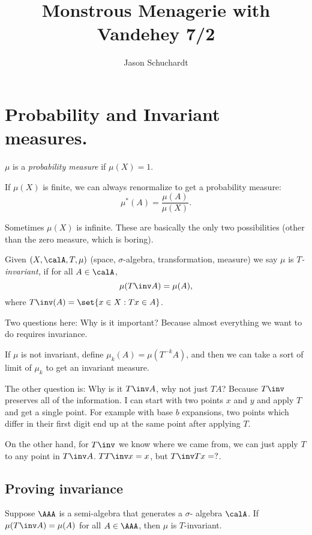 \documentclass{article}
\title{Monstrous Menagerie with Vandehey 7/2}
\author{Jason Schuchardt}
\theoremstyle{remark}
\begin{document}
\maketitle

\section{Probability and Invariant measures.}

\begin{definition}
    $\mu$ is a \emph{probability measure} if $\mu(X)=1$.
\end{definition}

If $\mu(X)$ is finite, we can always renormalize to get a
probability measure:
\[ \mu^*(A) = \frac{\mu(A)}{\mu(X)}. \]

Sometimes $\mu(X)$ is infinite. These are basically the only two
possibilities (other than the zero measure, which is boring).

\begin{definition}
Given $(X,\calA,T,\mu)$ 
(space, $\sigma$-algebra, transformation, measure)
we say $\mu$ is \emph{$T$-invariant,} if 
for all $A\in \calA$, 
\[\mu(T\inv A)=\mu(A),\]
where $T\inv(A) = \set{x\in X : Tx\in A}$.
\end{definition}

Two questions here: Why is it important? Because almost 
everything we want to do requires invariance.

If $\mu$ is not invariant,
define $\mu_k(A) = \mu(T^{-k}A)$,
and then we can take a sort of limit of $\mu_k$ to get an
invariant measure.

The other question is: Why is it $T\inv A$, why not just
$TA$? Because $T\inv$ preserves all of the information.
I can start with two points $x$ and $y$ and apply $T$ and
get a single point. For example with base $b$ expansions,
two points which differ in their first digit end up at the 
same point after applying $T$.

On the other hand, for $T\inv$ we know where we came from,
we can just apply $T$ to any point in $T\inv A$.
$TT\inv x = x$, but $T\inv T x = ?$.

\subsection{Proving invariance}

\begin{theorem}
    Suppose $\AAA$ is a semi-algebra that generates a $\sigma$-
    algebra $\calA$. If $\mu(T\inv A) = \mu(A)$ for all
    $A\in\AAA$, then $\mu$ is $T$-invariant.
\end{theorem}
\end{document}
